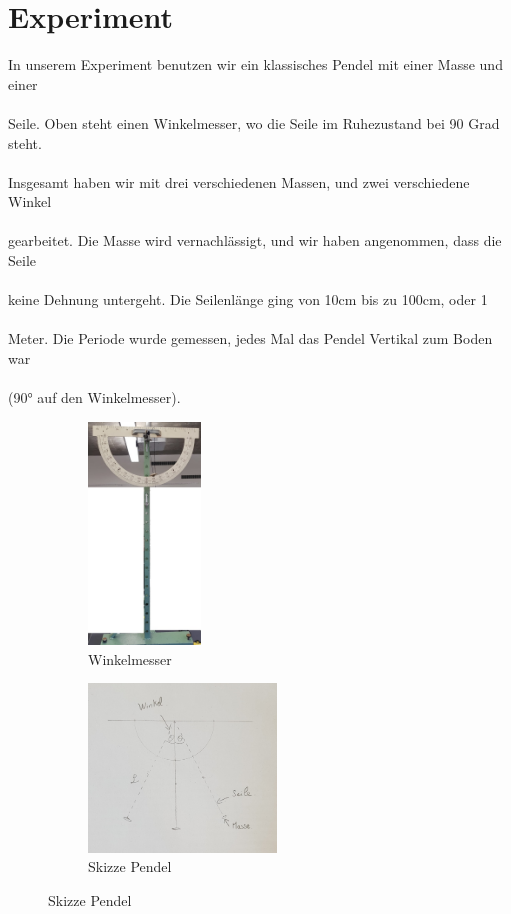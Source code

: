 \documentclass[12pt, a4paper, twoside]{article}
\begin{document}
        \section{Experiment}
        In unserem Experiment benutzen wir ein klassisches Pendel mit einer Masse und einer\\\\
        Seile. Oben steht einen Winkelmesser, wo die Seile im Ruhezustand bei 90 Grad steht.\\\\
        Insgesamt haben wir mit drei verschiedenen Massen, und zwei verschiedene Winkel\\\\
        gearbeitet. Die Masse wird vernachlässigt, und wir haben angenommen, dass die Seile\\\\
        keine Dehnung untergeht. Die Seilenlänge ging von 10cm bis zu 100cm, oder 1\\\\
        Meter. Die Periode wurde gemessen, jedes Mal das Pendel Vertikal zum Boden war\\\\
        (90° auf den Winkelmesser). 
        \vfill
        \begin{figure}[h!]
            \begin{subfigure}{.5\textwidth}
                \centering
                \includegraphics[scale=0.25, width=3cm]{Winkelmesser.png}
                \caption{Winkelmesser}
                \label{fig:winkelmesser}
            \end{subfigure}
            \begin{subfigure}{.5\textwidth}
                \centering
                \includegraphics[scale=0.25, width=5cm]{Pendulum.jpeg}
                \caption{Skizze Pendel}
                \label{fig:Pendulum}
            \end{subfigure}
        \end{figure}
        \newpage
\end{document}
